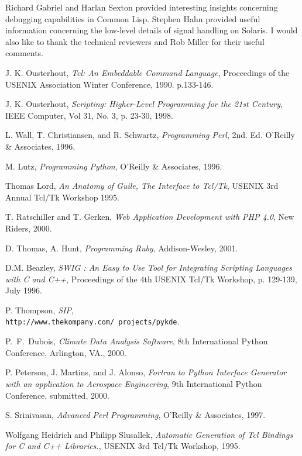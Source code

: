 Richard Gabriel and Harlan Sexton provided interesting insights
concerning debugging capabilities in Common Lisp.  Stephen Hahn
provided useful information concerning the low-level details of signal
handling on Solaris.  I would also like to thank the technical
reviewers and Rob Miller for their useful comments.

\begin{thebibliography}{99}


 J. K. Ousterhout, {\em Tcl: An Embeddable Command Language},
Proceedings of the USENIX Association Winter Conference, 1990. p.133-146.

 J. K. Ousterhout, {\em Scripting: Higher-Level Programming for the 21st Century},
IEEE Computer, Vol 31, No. 3, p. 23-30, 1998.

 L. Wall, T. Christiansen, and R. Schwartz, {\em Programming Perl}, 2nd. Ed.
O'Reilly \& Associates, 1996.

 M. Lutz, {\em Programming Python}, O'Reilly \& Associates, 1996.

 Thomas Lord, {\em An Anatomy of Guile, The Interface to 
Tcl/Tk}, USENIX 3rd Annual Tcl/Tk Workshop 1995.

 T. Ratschiller and T. Gerken, {\em Web Application Development with PHP 4.0},
New Riders, 2000.

 D. Thomas, A. Hunt, {\em Programming Ruby}, Addison-Wesley, 2001.

 D.M. Beazley, {\em SWIG : An Easy to Use Tool for Integrating Scripting Languages with C and C++}, Proceedings of the 4th USENIX Tcl/Tk Workshop, p. 129-139, July 1996. 

 P. Thompson, {\em SIP},\\
{\tt http://www.thekompany.com/ projects/pykde}.

 P.~F.~Dubois, {\em Climate Data Analysis Software}, 8th International Python Conference,
Arlington, VA., 2000.

 P. Peterson, J. Martins, and J. Alonso,
{\em Fortran to Python Interface Generator with an application to Aerospace
Engineering}, 9th International Python Conference, submitted, 2000.

 S. Srinivasan, {\em Advanced Perl Programming}, O'Reilly \& Associates, 1997.

 Wolfgang Heidrich and Philipp Slusallek, {\em Automatic Generation of Tcl Bindings for C and C++ Libraries.},
USENIX 3rd Tcl/Tk Workshop, 1995.


\end{thebibliography}
